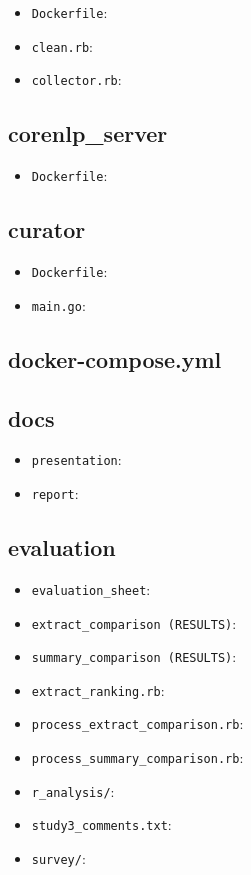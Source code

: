 \begin{itemize}

\item
  \texttt{Dockerfile}:
\item
  \texttt{clean.rb}:
\item
  \texttt{collector.rb}:
\end{itemize}

\subsection*{corenlp\_server}

\begin{itemize}

\item
  \texttt{Dockerfile}:
\end{itemize}

\subsection*{curator}

\begin{itemize}

\item
  \texttt{Dockerfile}:
\item
  \texttt{main.go}:
\end{itemize}

\subsection*{docker-compose.yml}

\subsection*{docs}

\begin{itemize}

\item
  \texttt{presentation}:
\item
  \texttt{report}:
\end{itemize}

\subsection*{evaluation}

\begin{itemize}

\item
  \texttt{evaluation\_sheet}:
\item
  \texttt{extract\_comparison\ (RESULTS)}:
\item
  \texttt{summary\_comparison\ (RESULTS)}:
\item
  \texttt{extract\_ranking.rb}:
\item
  \texttt{process\_extract\_comparison.rb}:
\item
  \texttt{process\_summary\_comparison.rb}:
\item
  \texttt{r\_analysis/}:
\item
  \texttt{study3\_comments.txt}:
\item
  \texttt{survey/}:
\end{itemize}

